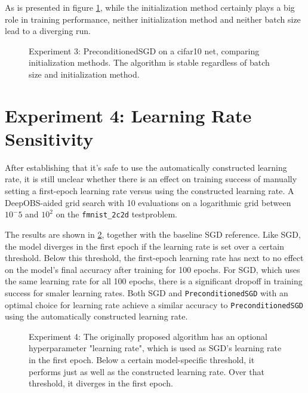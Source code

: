 \documentclass[twoside,12pt,a4paper]{report}
\begin{document}
As is presented in figure \ref{fig:exp_init}, while the initialization method certainly plays a big role in training performance, neither initialization method and neither batch size lead to a diverging run.
\begin{figure}
	\centering \hspace{-1,5cm}
	
	\caption{Experiment 3: PreconditionedSGD on a cifar10 net, comparing initialization methods. The algorithm is stable regardless of batch size and initialization method.}
	\label{fig:exp_init}
	
\end{figure}


\section{Experiment 4: Learning Rate Sensitivity}

After establishing that it's safe to use the automatically constructed learning rate, it is still unclear whether there is an effect on training success of manually setting a first-epoch learning rate versus using the constructed learning rate.
A DeepOBS-aided grid search with 10 evaluations on a logarithmic grid between $10^-5$ and $10^2$ on the \verb|fmnist_2c2d| testproblem.

The results are shown in \ref{fig:exp_lr_sens}, together with the baseline SGD reference.
Like SGD, the model diverges in the first epoch if the learning rate is set over a certain threshold. Below this threshold, the first-epoch learning rate has next to no effect on the model's final accuracy after training for 100 epochs. For SGD, which uses the same learning rate for all 100 epochs, there is a significant dropoff in training success for smaler learning rates.
Both SGD and \verb|PreconditionedSGD| with an optimal choice for learning rate achieve a similar accuracy to \verb|PreconditionedSGD| using the automatically constructed learning rate. 

\begin{figure}
	\centering \hspace{-1,5cm}
	
	\caption{Experiment 4: The originally proposed algorithm has an optional hyperparameter "learning rate", which is used as SGD's learning rate in the first epoch. Below a certain model-specific threshold, it performs just as well as the constructed learning rate. Over that threshold, it diverges in the first epoch. }
	\label{fig:exp_lr_sens}
\end{figure}
\end{document}

